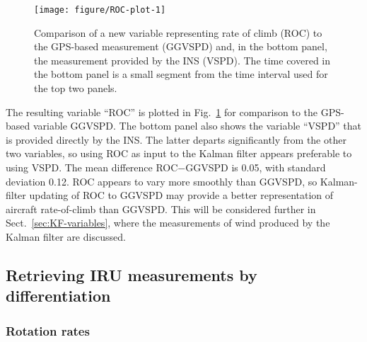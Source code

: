\documentclass[12pt,twoside,english,12pt,twoside,english]{article}\usepackage[]{graphicx}\usepackage[]{color}
\makeatletter
\def\maxwidth{ %
  \ifdim\Gin@nat@width>\linewidth
    \linewidth
  \else
    \Gin@nat@width
  \fi
}
\newenvironment{knitrout}{}{} %
\let\OrgIndex\index
\renewcommand*{\index}[1]{\OrgIndex{#1}}
\makeatother
\begin{document}
\begin{knitrout}
\color{fgcolor}\begin{figure}

{\centering \texttt{[image: figure/ROC-plot-1]} 

}

\caption[Comparison of a new variable representing rate of climb to the corresponding GPS-based measurement and the INS-provided measurement.]{Comparison of a new variable representing rate of climb (ROC) to the GPS-based measurement (GGVSPD) and, in the bottom panel, the measurement provided by the INS (VSPD). The time covered in the bottom panel is a small segment from the time interval used for the top two panels.}\label{fig:ROC-plot}
\end{figure}


\end{knitrout}

The resulting variable
``ROC'' is plotted in Fig.~\ref{fig:ROC-plot}
for comparison to the GPS-based variable
GGVSPD. The bottom panel
also shows the variable ``VSPD''
that is provided directly by the INS.
The latter departs significantly from the other two variables, so
using ROC as input to the Kalman filter
appears preferable to using VSPD. The mean difference ROC$-$GGVSPD
is 0.05, with standard deviation 0.12.
ROC appears to vary more smoothly than GGVSPD, so Kalman-filter updating
of ROC to GGVSPD may provide a better representation of aircraft rate-of-climb
than GGVSPD. This will be considered further in Sect.~\ref{sec:KF-variables},
where the measurements of wind produced by the Kalman filter are discussed.

\subsection{Retrieving IRU measurements by differentiation}

\subsubsection{Rotation rates\label{subsec:Rotations}}
\end{document}

